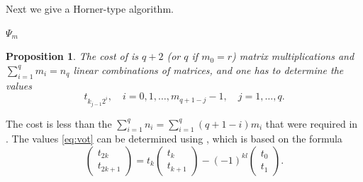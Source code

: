 \documentclass[a4paper,fleqn]{cas-sc}
\newtheorem{proposition}[theorem]{Proposition}
\begin{document}
Next we give a Horner-type algorithm. 
\begin{algorithm}
\caption{\label{alg:ALG2} Nested binary, additive.\\
Input: $r,l,m\geq r+l$ and nested binary representation \eqref{eq:ms},\eqref{eq:kj}.\\
Output: An expression for $\Psi_m$ in terms of $\Psi_{r+l}$, $\Psi_r$, $\Psi_{m_0}$ and the values \eqref{eq:vot}.}

\begin{algorithmic}
\ENDIF
{}
\ENDFOR
{}
\ENDIF
\ENDFOR
\RETURN $\Psi_m$
\end{algorithmic}
\end{algorithm}

\begin{proposition}
The cost of  is $q+2$ (or $q$ if $m_0=r$) matrix multiplications and $\sum_{i=1}^q m_i=n_q$ linear combinations of matrices, and one has to determine the values
\begin{equation} \label{eq:vot}
t_{k_{j-1}2^i},\quad i=0,1,\ldots,m_{q+1-j}-1,\quad j=1,\ldots,q.
\end{equation}
\end{proposition}
The cost is less than the $\sum_{i=1}^q n_i=\sum_{i=1}^q (q+1-i)m_i$ that were required in . The values \eqref{eq:vot} can be determined using , which is based on the formula
\begin{equation} \label{nice}
\begin{pmatrix}
t_{2k}\\
t_{2k+1}
\end{pmatrix}=t_k
\begin{pmatrix}
t_{k}\\
t_{k+1}
\end{pmatrix}
-(-1)^{kl}\begin{pmatrix}
t_{0}\\
t_{1}
\end{pmatrix}.
\end{equation}
\end{document}

